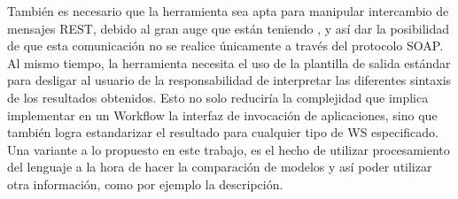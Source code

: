 También es necesario que la herramienta sea apta para manipular intercambio de mensajes REST, debido al gran auge que están teniendo , y así dar la posibilidad de que esta comunicación no se realice únicamente a través del protocolo SOAP.\\

Al mismo tiempo, la herramienta necesita el uso de la plantilla de salida estándar para desligar al usuario de la responsabilidad de interpretar las diferentes sintaxis de los resultados obtenidos. Esto no solo reduciría la complejidad que implica implementar en un Workflow la interfaz de invocación de aplicaciones, sino que también logra estandarizar el resultado para cualquier tipo de WS especificado.\\

Una variante a lo propuesto en este trabajo, es el hecho de utilizar procesamiento del lenguaje a la hora de hacer la comparación de modelos y así poder utilizar otra información, como por ejemplo la descripción. 